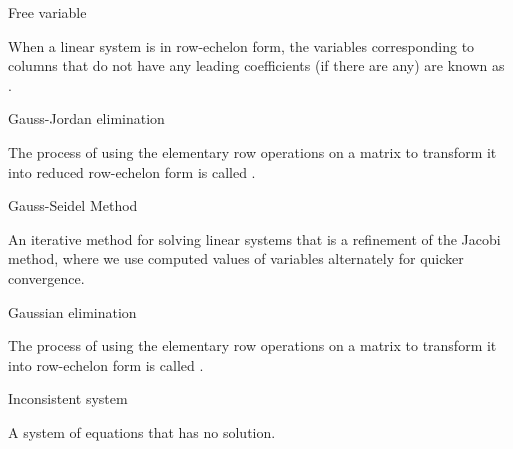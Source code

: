 \documentclass{ximera}
\begin{document}
Free variable
\begin{expandable}
    When a linear system is in row-echelon form, the variables corresponding to columns that do not have any leading coefficients (if there are any) are known as .
\end{expandable}


 Gauss-Jordan elimination 
\begin{expandable}
    The process of using the elementary row operations on a matrix to transform it into reduced row-echelon form is called .
\end{expandable}




Gauss-Seidel Method
\begin{expandable}
    An iterative method for solving linear systems that is a refinement of the Jacobi method, where we use computed values of variables alternately for quicker convergence.
\end{expandable}



 Gaussian elimination
\begin{expandable}
    The process of using the elementary row operations on a matrix to transform it into row-echelon form is called .
\end{expandable}



Inconsistent system
\begin{expandable}
    A system of equations that has no solution.
\end{expandable}


\end{document}
